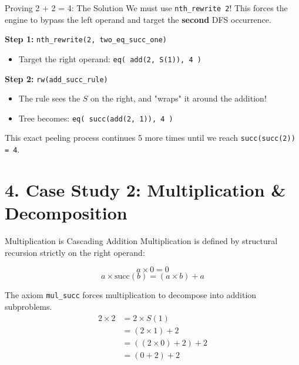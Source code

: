 \documentclass[aspectratio=169, 10pt]{beamer}
\begin{document}
\begin{frame}[fragile]{Proving 2 + 2 = 4: The Solution}
    We must use \texttt{nth\_rewrite 2}! This forces the engine to bypass the left operand and target the \textbf{second} DFS occurrence.
    
    \vspace{1em}
    \textbf{Step 1:} \texttt{nth\_rewrite(2, two\_eq\_succ\_one)}
    \begin{itemize}
        \item Target the right operand: \texttt{eq( add(2, S(1)), 4 )}
    \end{itemize}
    
    \vspace{1em}
    \textbf{Step 2:} \texttt{rw(add\_succ\_rule)}
    \begin{itemize}
        \item The rule sees the $S$ on the right, and "wraps" it around the addition!
        \item Tree becomes: \texttt{eq( succ(add(2, 1)), 4 )}
    \end{itemize}
    
    This exact peeling process continues 5 more times until we reach \texttt{succ(succ(2)) = 4}.
\end{frame}

\section{4. Case Study 2: Multiplication \& Decomposition}

\begin{frame}[fragile]{Multiplication is Cascading Addition}
    Multiplication is defined by structural recursion strictly on the right operand:
    
    \begin{equation*}
    a \times 0 = 0
    \end{equation*}
    \begin{equation*}
    a \times \mathrm{succ}(b) = (a \times b) + a
    \end{equation*}
    
    The axiom \texttt{mul\_succ} forces multiplication to decompose into addition subproblems.
    \begin{align*}
        2 \times 2 &= 2 \times S(1) \\
                   &= (2 \times 1) + 2 \\
                   &= ((2 \times 0) + 2) + 2 \\
                   &= (0 + 2) + 2
    \end{align*}
\end{frame}
\end{document}
